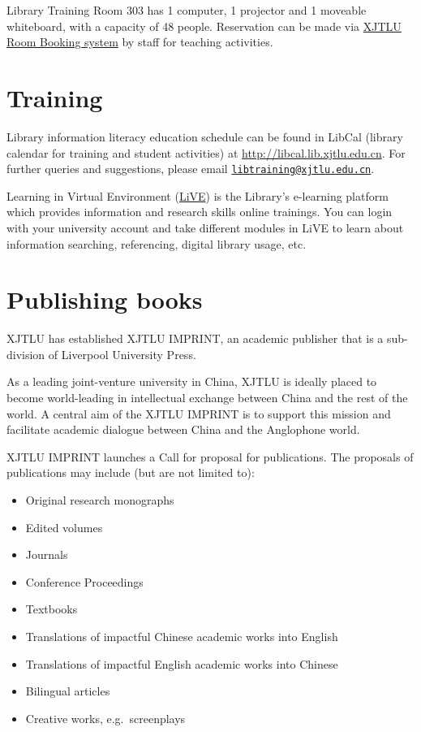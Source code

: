 \documentclass[
]{book}
\providecommand{\tightlist}{%
  \setlength{\itemsep}{0pt}\setlength{\parskip}{0pt}}
\begin{document}
Library Training Room 303 has 1 computer, 1 projector and 1 moveable whiteboard, with a capacity of 48 people. Reservation can be made via \href{http://mrbs.xjtlu.edu.cn/day.php}{XJTLU Room Booking system} by staff for teaching activities.

\hypertarget{training}{%
\section{Training}\label{training}}

Library information literacy education schedule can be found in LibCal (library calendar for training and student activities) at \url{http://libcal.lib.xjtlu.edu.cn}. For further queries and suggestions, please email \href{mailto:libtraining@xjtlu.edu.cn}{\nolinkurl{libtraining@xjtlu.edu.cn}}.

Learning in Virtual Environment (\href{http://vle.lib.xjtlu.edu.cn}{LiVE}) is the Library's e-learning platform which provides information and research skills online trainings. You can login with your university account and take different modules in LiVE to learn about information searching, referencing, digital library usage, etc.

\hypertarget{publishing-books}{%
\section{Publishing books}\label{publishing-books}}

XJTLU has established XJTLU IMPRINT, an academic publisher that is a sub-division of Liverpool University Press.

As a leading joint-venture university in China, XJTLU is ideally placed to become world-leading in intellectual exchange between China and the rest of the world. A central aim of the XJTLU IMPRINT is to support this mission and facilitate academic dialogue between China and the Anglophone world.

XJTLU IMPRINT launches a Call for proposal for publications. The proposals of publications may include (but are not limited to):

\begin{itemize}
\tightlist
\item
  Original research monographs
\item
  Edited volumes
\item
  Journals
\item
  Conference Proceedings\\
\item
  Textbooks
\item
  Translations of impactful Chinese academic works into English
\item
  Translations of impactful English academic works into Chinese
\item
  Bilingual articles\\
\item
  Creative works, e.g.~screenplays
\end{itemize}
\end{document}

